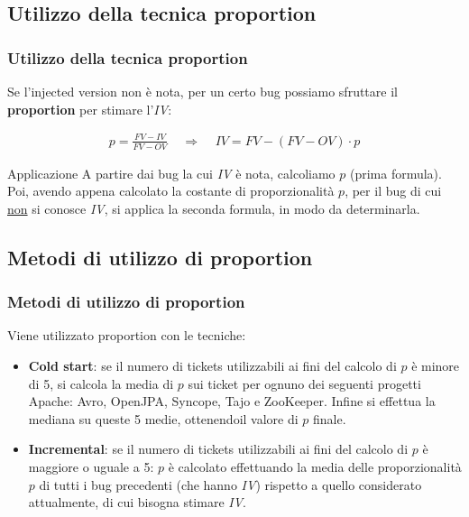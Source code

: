 \documentclass{beamer}
\newcommand{\dflvspace}{\vspace{10pt}}
\begin{document}
\subsection{Utilizzo della tecnica proportion}
\begin{frame}
	\frametitle{Utilizzo della tecnica proportion}
	Se l'injected version non è nota, per un certo bug
	possiamo sfruttare il \textbf{proportion} per stimare l'\textit{IV}:
	
	\dflvspace
	
	\begin{align*}
	p = \frac{FV-IV}{FV-OV}\;\;\;\;\Rightarrow\;\;\;\;IV = FV - (FV - OV)\cdot p
	\end{align*}
	
	\dflvspace
	
	\begin{exampleblock}{Applicazione}
	A partire dai bug la cui \textit{IV} è nota, calcoliamo $p$ (prima formula). 
	Poi, avendo appena calcolato la costante di proporzionalità $p$, per il bug di cui
	\underline{non} si conosce \textit{IV}, si applica la seconda formula, in modo da determinarla.
	\end{exampleblock}
\end{frame}

\subsection{Metodi di utilizzo di proportion}
\begin{frame}
	\frametitle{Metodi di utilizzo di proportion}
	Viene utilizzato proportion con le tecniche:
	\begin{itemize}
		\item \textbf{Cold start}: se il numero di tickets utilizzabili ai fini del calcolo di $p$ è minore
		di 5, si calcola la media di $p$ sui ticket per ognuno dei seguenti progetti Apache: 
		Avro, OpenJPA, Syncope, Tajo e ZooKeeper. 
		Infine si effettua la mediana su queste 5 medie, ottenendoil valore di $p$ finale.
		\item \textbf{Incremental}: se il numero di tickets utilizzabili ai fini del calcolo di $p$ è maggiore o
		uguale a 5: $p$ è calcolato effettuando la media delle proporzionalità $p$ di tutti i bug precedenti 
		(che hanno \textit{IV})
		rispetto a quello considerato attualmente, di cui bisogna stimare \textit{IV}.
	\end{itemize}
\end{frame}
\end{document}
